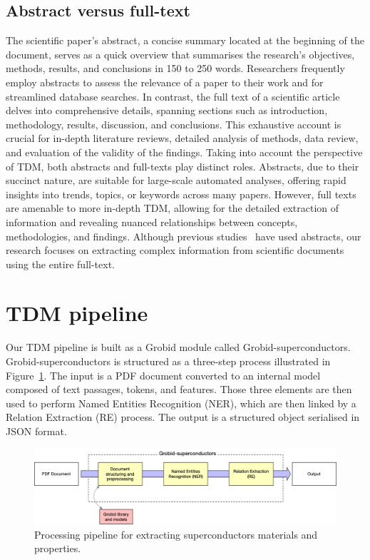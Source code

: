 \subsection{Abstract versus full-text}
The scientific paper's abstract, a concise summary located at the beginning of the document, serves as a quick overview that summarises the research's objectives, methods, results, and conclusions in 150 to 250 words. 
Researchers frequently employ abstracts to assess the relevance of a paper to their work and for streamlined database searches. 
In contrast, the full text of a scientific article delves into comprehensive details, spanning sections such as introduction, methodology, results, discussion, and conclusions. This exhaustive account is crucial for in-depth literature reviews, detailed analysis of methods, data review, and evaluation of the validity of the findings.
Taking into account the perspective of TDM, both abstracts and full-texts play distinct roles. Abstracts, due to their succinct nature, are suitable for large-scale automated analyses, offering rapid insights into trends, topics, or keywords across many papers. However, full texts are amenable to more in-depth TDM, allowing for the detailed extraction of information and revealing nuanced relationships between concepts, methodologies, and findings. 
Although previous studies~\cite{yamaguchi-etal-2020-sc} have used abstracts, our research focuses on extracting complex information from scientific documents using the entire full-text.


\section{TDM pipeline}
\label{subsubsec:document-structuring}

Our TDM pipeline is built as a Grobid module called Grobid-superconductors. 
Grobid-superconductors is structured as a three-step process illustrated in Figure~\ref{fig:pipeline-overview}. The input is a PDF document converted to an internal model composed of text passages, tokens, and features. Those three elements are then used to perform Named Entities Recognition (NER), which are then linked by a Relation Extraction (RE) process. 
The output is a structured object serialised in JSON format.

\begin{figure}[htbp]
    \includegraphics[width=\textwidth]{figures/automatic_extraction_supercon/schema-architecture-colors.png}
    \caption{Processing pipeline for extracting superconductors materials and properties. }
    \label{fig:pipeline-overview}
\end{figure}

